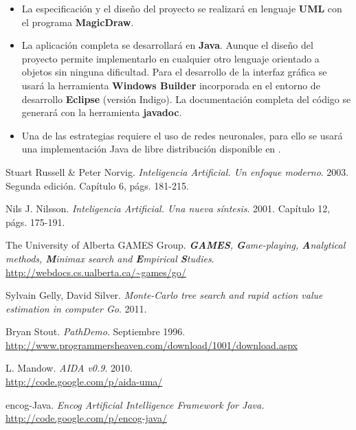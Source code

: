 \documentclass[a4paper,12pt]{article}
\begin{document}
\begin{itemize}
	\item La especificación y el diseño del proyecto se realizará en lenguaje \textbf{UML} con el programa \textbf{MagicDraw}.
	
	\item La aplicación completa se desarrollará en \textbf{Java}.
	Aunque el diseño del proyecto permite implementarlo en cualquier otro lenguaje orientado a objetos sin ninguna dificultad.
	Para el desarrollo de la interfaz gráfica se usará la herramienta \textbf{Windows Builder} incorporada en el entorno de desarrollo \textbf{Eclipse} (versión Indigo).
	La documentación completa del código se generará con la herramienta \textbf{javadoc}.

	\item Una de las estrategias requiere el uso de redes neuronales, para ello se usará una implementación Java de libre distribución disponible en \cite{JavaNN}.

	
\end{itemize}

\begin{thebibliography}{99}

 Stuart Russell \& Peter Norvig. \emph{Inteligencia Artificial. Un enfoque moderno}. 2003. Segunda edición. Capítulo 6, págs. 181-215.

 Nils J. Nilsson. \emph{Inteligencia Artificial. Una nueva síntesis}. 2001. Capítulo 12, págs. 175-191.

 The University of Alberta GAMES Group. \emph{\textbf{GAMES}, \textbf{G}ame-playing, \textbf{A}nalytical methods, \textbf{M}inimax search and \textbf{E}mpirical \textbf{S}tudies}.\\
	\url{http://webdocs.cs.ualberta.ca/~games/go/}

 Sylvain Gelly, David Silver. \emph{Monte-Carlo tree search and rapid action value estimation in computer Go}. 2011.

 Bryan Stout. \emph{PathDemo}. Septiembre 1996.\\
	\url{http://www.programmersheaven.com/download/1001/download.aspx}

 L. Mandow. \emph{AIDA v0.9}. 2010.\\
	\url{http://code.google.com/p/aida-uma/}

 encog-Java. \emph{Encog Artificial Intelligence Framework for Java.}\\
	\url{http://code.google.com/p/encog-java/}

\end{thebibliography}
\end{document}
